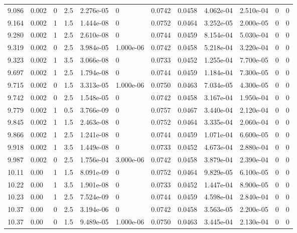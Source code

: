 \documentclass[preview]{standalone}
\begin{document}
{{{{\begin{tabular}{L{1.2cm}C{1.2cm} C{0.3cm}C{0.5cm} C{1.4cm}C{1.4cm} C{1.4cm}C{1.4cm} C{1.6cm}C{1.6cm} C{1.6cm}C{1.6cm}}
  9.086  &  0.002  & 0     & 2.5 &  2.276e-05  & 0  &  0.0742&   0.0458& 4.062e-04 & 2.510e-04   &  0 & 0  \\ 
  9.164  &  0.002  & 1     & 1.5 &  1.444e-08  & 0  &  0.0752&   0.0464& 3.252e-05 & 2.000e-05   &  0 & 0  \\ 
  9.280  &  0.002  & 1     & 2.5 &  2.610e-08  & 0  &  0.0744&   0.0459& 8.154e-04 & 5.030e-04   &  0 & 0  \\ 
  9.319  &  0.002  & 0     & 2.5 &  3.984e-05  & 1.000e-06  &  0.0742&   0.0458& 5.218e-04 & 3.220e-04   &  0 & 0  \\ 
  9.323  &  0.002  & 1     & 3.5 &  3.066e-08  & 0  &  0.0733&   0.0452& 1.255e-04 & 7.700e-05   &  0 & 0  \\ 
  9.697  &  0.002  & 1     & 2.5 &  1.794e-08  & 0  &  0.0744&   0.0459& 1.184e-04 & 7.300e-05   &  0 & 0  \\ 
  9.715  &  0.002  & 0     & 1.5 &  3.313e-05  & 1.000e-06  &  0.0750&   0.0463& 7.034e-05 & 4.300e-05   &  0 & 0  \\ 
  9.742  &  0.002  & 0     & 2.5 &  1.548e-05  & 0  &  0.0742&   0.0458& 3.167e-04 & 1.950e-04   &  0 & 0  \\ 
  9.779  &  0.002  & 1     & 0.5 &  3.766e-09  & 0  &  0.0757&   0.0467& 3.440e-04 & 2.120e-04   &  0 & 0  \\ 
  9.845  &  0.002  & 1     & 1.5 &  2.463e-08  & 0  &  0.0752&   0.0464& 3.335e-04 & 2.060e-04   &  0 & 0  \\ 
  9.866  &  0.002  & 1     & 2.5 &  1.241e-08  & 0  &  0.0744&   0.0459& 1.071e-04 & 6.600e-05   &  0 & 0  \\ 
  9.918  &  0.002  & 1     & 3.5 &  1.449e-08  & 0  &  0.0733&   0.0452& 4.673e-04 & 2.880e-04   &  0 & 0  \\ 
  9.987  &  0.002  & 0     & 2.5 &  1.756e-04  & 3.000e-06  &  0.0742&   0.0458& 3.879e-04 & 2.390e-04   &  0 & 0  \\ 
  10.11  &  0.00  & 1     & 1.5 &  8.091e-09  & 0  &  0.0752&   0.0464& 9.829e-05 & 6.100e-05   &  0 & 0  \\ 
  10.22  &  0.00  & 1     & 3.5 &  1.901e-08  & 0  &  0.0733&   0.0452& 1.447e-04 & 8.900e-05   &  0 & 0  \\ 
  10.23  &  0.00  & 1     & 2.5 &  7.524e-09  & 0  &  0.0744&   0.0459& 4.598e-04 & 2.840e-04   &  0 & 0  \\ 
  10.37  &  0.00  & 0     & 2.5 &  3.194e-06  & 0  &  0.0742&   0.0458& 3.563e-05 & 2.200e-05   &  0 & 0  \\ 
  10.37  &  0.00  & 0     & 1.5 &  9.489e-05  & 1.000e-06  &  0.0750&   0.0463& 3.445e-04 & 2.130e-04   &  0 & 0  \\ 

\end{tabular}}}}}
\end{document}
